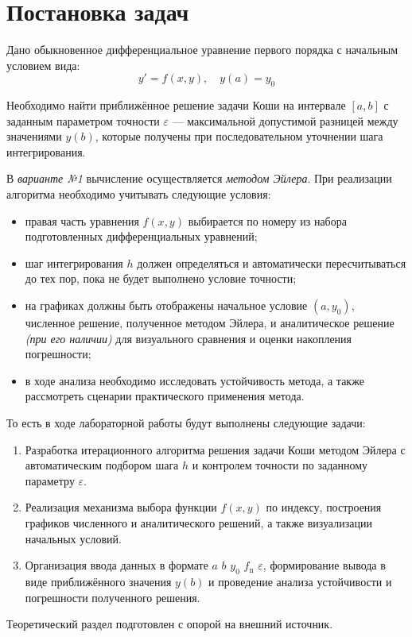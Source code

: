 \section{Постановка задач}

Дано обыкновенное дифференциальное уравнение первого порядка с начальным условием вида:
\[
  y'=f(x,y),\quad y(a)=y_0
\]

Необходимо найти приближённое решение задачи Коши на интервале $[a, b]$ с заданным параметром точности $\varepsilon$ --- максимальной допустимой разницей между значениями $y(b)$, которые получены при последовательном уточнении шага интегрирования.

В \textit{варианте №1} вычисление осуществляется \textit{методом Эйлера}. При реализации алгоритма необходимо учитывать следующие условия:
\begin{itemize}
  \item правая часть уравнения $f(x, y)$ выбирается по номеру из набора подготовленных дифференциальных уравнений;
  \item шаг интегрирования $h$ должен определяться и автоматически пересчитываться до тех пор, пока не будет выполнено условие точности;
  \item на графиках должны быть отображены начальное условие $(a, y_0)$, численное решение, полученное методом Эйлера, и аналитическое решение \textit{(при его наличии)} для визуального сравнения и оценки накопления погрешности;
  \item в ходе анализа необходимо исследовать устойчивость метода, а также рассмотреть сценарии практического применения метода.
\end{itemize}

То есть в ходе лабораторной работы будут выполнены следующие задачи:

\begin{enumerate}
  \item Разработка итерационного алгоритма решения задачи Коши методом Эйлера с автоматическим подбором шага $h$ и контролем точности по заданному параметру $\varepsilon$.
  \item Реализация механизма выбора функции $f(x, y)$ по индексу, построения графиков численного и аналитического решений, а также визуализации начальных условий.
  \item Организация ввода данных в формате $a$ $b$ $y_0$ $f_{\text{n}}$ $\varepsilon$, формирование вывода в виде приближённого значения $y(b)$ и проведение анализа устойчивости и погрешности полученного решения.
\end{enumerate}

Теоретический раздел подготовлен с опорой на внешний источник\cite{burden2011numerical}.